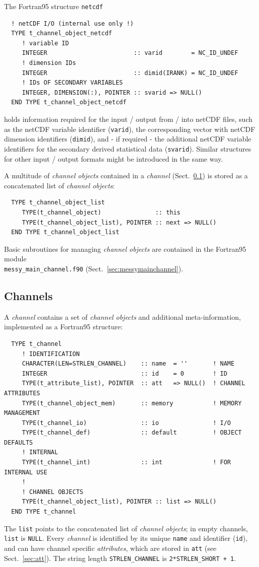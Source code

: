 \documentclass[twoside]{article}
\begin{document}
The Fortran95 structure {\tt netcdf}
%
\begin{verbatim}
  ! netCDF I/O (internal use only !)
  TYPE t_channel_object_netcdf
     ! variable ID
     INTEGER                        :: varid        = NC_ID_UNDEF
     ! dimension IDs
     INTEGER                        :: dimid(IRANK) = NC_ID_UNDEF
     ! IDs OF SECONDARY VARIABLES
     INTEGER, DIMENSION(:), POINTER :: svarid => NULL()
  END TYPE t_channel_object_netcdf
\end{verbatim}
%
holds information required for the input / output from / into
netCDF files,
such as the netCDF variable identifier ({\tt varid}),
the corresponding vector with netCDF dimension identifiers ({\tt dimid}),
and - if required - the additional netCDF variable identifiers for the
secondary derived statistical data ({\tt svarid}).
%
Similar structures for other input / output formats might be introduced
in the same way.

A multitude of {\it channel objects} contained in a {\it channel}
(Sect.~\ref{sec:chan}) is stored as a concatenated list of
{\it channel objects}:

\begin{verbatim}
  TYPE t_channel_object_list
     TYPE(t_channel_object)               :: this
     TYPE(t_channel_object_list), POINTER :: next => NULL()
  END TYPE t_channel_object_list
\end{verbatim}

Basic subroutines for managing {\it channel objects}
are contained in the Fortran95 module\\
{\tt messy\_main\_channel.f90}
(Sect.~\ref{sec:messymainchannel}).

\subsection{Channels}
\label{sec:chan}
%
A {\it channel} contains a set of {\it channel objects} and additional
meta-information, implemented as a Fortran95 structure:
%
\begin{verbatim}
  TYPE t_channel
     ! IDENTIFICATION
     CHARACTER(LEN=STRLEN_CHANNEL)    :: name  = ''       ! NAME
     INTEGER                          :: id    = 0        ! ID
     TYPE(t_attribute_list), POINTER  :: att   => NULL()  ! CHANNEL ATTRIBUTES
     TYPE(t_channel_object_mem)       :: memory           ! MEMORY MANAGEMENT
     TYPE(t_channel_io)               :: io               ! I/O
     TYPE(t_channel_def)              :: default          ! OBJECT DEFAULTS
     ! INTERNAL
     TYPE(t_channel_int)              :: int              ! FOR INTERNAL USE
     !
     ! CHANNEL OBJECTS
     TYPE(t_channel_object_list), POINTER :: list => NULL()
  END TYPE t_channel
\end{verbatim}
%
The {\tt list} points to the concatenated list of {\it channel objects};
in empty channels, {\tt list} is {\tt NULL}.
Every {\it channel} is identified by its unique {\tt name} and identifier
({\tt id}), and can have channel specific {\it attributes}, which are
stored in {\tt att} (see Sect.~\ref{sec:att}).
The string length {\tt STRLEN\_CHANNEL} is {\tt 2*STRLEN\_SHORT + 1}.
\end{document}
